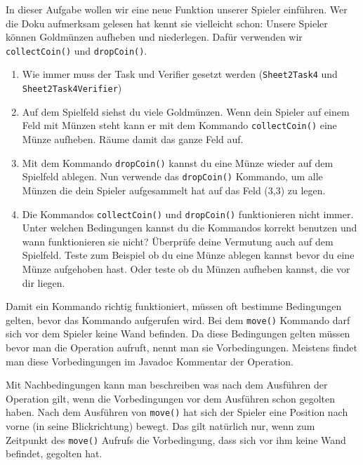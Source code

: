

In dieser Aufgabe wollen wir eine neue Funktion unserer Spieler einführen. 
Wer die Doku aufmerksam gelesen hat kennt sie vielleicht schon: 
Unsere Spieler können Goldmünzen aufheben und niederlegen. 
Dafür verwenden wir \lstinline{collectCoin()} und \lstinline{dropCoin()}.

\begin{enumerate}
    \item Wie immer muss der Task und Verifier gesetzt werden (\lstinline{Sheet2Task4} und \lstinline{Sheet2Task4Verifier})
    \item Auf dem Spielfeld siehst du viele Goldmünzen.
        Wenn dein Spieler auf einem Feld mit Münzen steht kann er mit dem Kommando \lstinline{collectCoin()} eine Münze aufheben.
        Räume damit das ganze Feld auf.
    \item Mit dem Kommando \lstinline{dropCoin()} kannst du eine Münze wieder auf dem Spielfeld ablegen.
        Nun verwende das \lstinline{dropCoin()} Kommando, um alle Münzen die dein Spieler aufgesammelt hat auf das Feld (3,3) zu legen.
    \item Die Kommandos \lstinline{collectCoin()} und \lstinline{dropCoin()} funktionieren nicht immer.
        Unter welchen Bedingungen kannst du die Kommandos korrekt benutzen und wann funktionieren sie nicht?
        Überprüfe deine Vermutung auch auf dem Spielfeld.
        Teste zum Beispiel ob du eine Münze ablegen kannst bevor du eine Münze aufgehoben hast.
        Oder teste ob du Münzen aufheben kannst, die vor dir liegen.
\end{enumerate}


\begin{Infobox}
    Damit ein Kommando richtig funktioniert, müssen oft bestimme Bedingungen gelten, bevor das Kommando aufgerufen wird.
    Bei dem \lstinline{move()} Kommando darf sich vor dem Spieler keine Wand befinden.
    Da diese Bedingungen gelten müssen bevor man die Operation aufruft, nennt man sie Vorbedingungen.
    Meistens findet man diese Vorbedingungen im Javadoc Kommentar der Operation.

    Mit Nachbedingungen kann man beschreiben was nach dem Ausführen der Operation gilt, wenn die Vorbedingungen vor dem Ausführen schon gegolten haben.
    Nach dem Ausführen von \lstinline{move()} hat sich der Spieler eine Position nach vorne (in seine Blickrichtung) bewegt.
    Das gilt natürlich nur, wenn zum Zeitpunkt des \lstinline{move()} Aufrufs die Vorbedingung, dass sich vor ihm keine Wand befindet, gegolten hat.
\end{Infobox}
